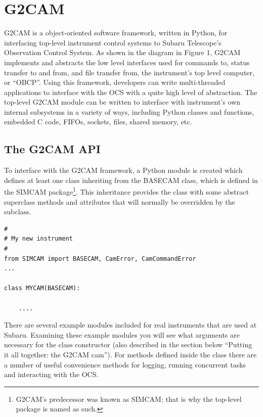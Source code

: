 \documentclass[11pt]{report}
\begin{document}
\chapter{G2CAM}
G2CAM is a object-oriented software framework, written in Python, for
interfacing top-level instrument control systems to Subaru Telescope's
Observation Control System. As shown in the diagram in Figure 1, G2CAM
implements and abstracts the low level interfaces used for commands to,
status transfer to and from, and file transfer from, the instrument's
top level computer, or ``OBCP''. Using this framework, developers can
write multi-threaded applications to interface with the OCS with a quite
high level of abstraction. The top-level G2CAM module can be written to
interface with instrument's own internal subsystems in a variety of
ways, including Python classes and functions, embedded C code, FIFOs,
sockets, files, shared memory, etc. 

\section{The G2CAM API}
To interface with the G2CAM framework, a Python module is created which
defines at least one class inheriting from the BASECAM class, which is
defined in the SIMCAM package\footnote{G2CAM's predecessor was known as
SIMCAM; that is why the top-level package is named as such.}.
This inheritance provides the class with some abstract superclass
methods and attributes that will normally be overridden by the subclass. 

\begin{verbatim}
#
# My new instrument
#
from SIMCAM import BASECAM, CamError, CamCommandError
...

class MYCAM(BASECAM):

    ....

\end{verbatim}
There are several example modules included for real instruments that are
used at Subaru. Examining these example modules you will see what
arguments are necessary for the class constructor (also described in the
section below ``Putting it all together: the G2CAM cam'').
For methods defined inside the class there are a number of useful
convenience methods for logging, running concurrent tasks and
interacting with the OCS. 
\end{document}
